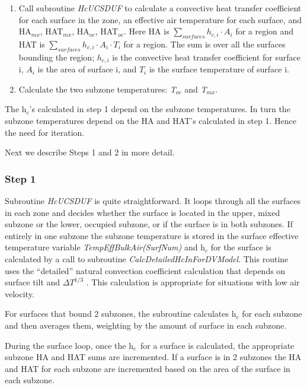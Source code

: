{\begin{enumerate}
\item Call subroutine \emph{HcUCSDUF} to calculate a convective heat transfer coefficient for each surface in the zone, an effective air temperature for each surface, and HA\(_{mx}\), HAT\(_{mx}\), HA\(_{oc}\), HAT\(_{oc}\). Here HA is \(\sum\limits_{surfaces} {{h_{c,i}} \cdot {A_i}}\) for a region and HAT is \(\sum\limits_{surfaces} {{h_{c,i}} \cdot {A_i}} \cdot {T_i}\) for a region. The sum is over all the surfaces bounding the region; \({{h_{c,i}}}\) is the convective heat transfer coefficient for surface i, \({A_i}\) is the area of surface i, and \({T_i}\) is the surface temperature of surface i.
\item Calculate the two subzone temperatures: \emph{T\(_{oc}\)} and \emph{T\(_{mx}\)}.
\end{enumerate}

The h\(_{c}\)'s calculated in step 1 depend on the subzone temperatures. In turn the subzone temperatures depend on the HA and HAT's calculated in step 1. Hence the need for iteration.

Next we describe Steps 1 and 2 in more detail.

\subsubsection{Step 1}\label{step-1-1}

Subroutine \emph{HcUCSDUF} is quite straightforward. It loops through all the surfaces in each zone and decides whether the surface is located in the upper, mixed subzone or the lower, occupied subzone, or if the surface is in both subzones. If entirely in one subzone the subzone temperature is stored in the surface effective temperature variable \emph{TempEffBulkAir(SurfNum)} and h\(_{c}\) for the surface is calculated by a call to subroutine \emph{CalcDetailedHcInForDVModel}. This routine uses the ``detailed'' natural convection coefficient calculation that depends on surface tilt and \(\Delta {T^{1/3}}\) . This calculation is appropriate for situations with low air velocity.

For surfaces that bound 2 subzones, the subroutine calculates h\(_{c}\) for each subzone and then averages them, weighting by the amount of surface in each subzone.

During the surface loop, once the h\(_{c}\)~for a surface is calculated, the appropriate subzone HA and HAT sums are incremented. If a surface is in 2 subzones the HA and HAT for each subzone are incremented based on the area of the surface in each subzone.

}
